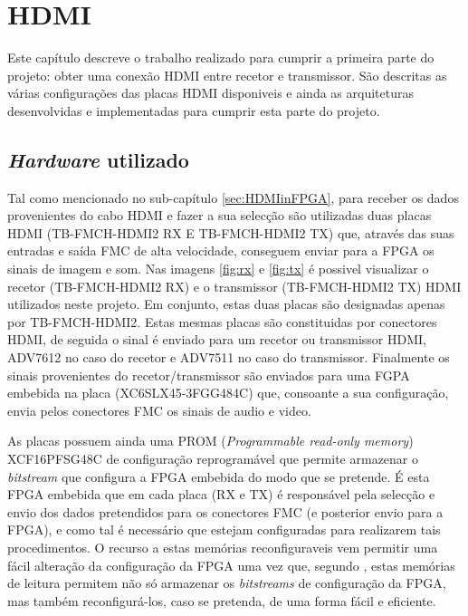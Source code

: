 \chapter{HDMI}\label{chap:chap3}

Este capítulo descreve o trabalho realizado para cumprir a primeira parte do projeto: obter uma conexão HDMI entre recetor e transmissor. São descritas as várias configurações das placas HDMI disponiveis e ainda as arquiteturas desenvolvidas e implementadas para cumprir esta parte do projeto. 

\section{\textit{Hardware} utilizado}

Tal como mencionado no sub-capítulo \ref{sec:HDMIinFPGA}, para receber os dados provenientes do cabo HDMI e fazer a sua selecção são utilizadas duas placas HDMI (TB-FMCH-HDMI2 RX E TB-FMCH-HDMI2 TX) que, através das suas entradas e saída FMC de alta velocidade, conseguem enviar para a FPGA os sinais de imagem e som. Nas imagens \ref{fig:rx} e \ref{fig:tx} é possivel visualizar o recetor (TB-FMCH-HDMI2 RX) e o transmissor (TB-FMCH-HDMI2 TX) HDMI utilizados neste projeto. Em conjunto, estas duas placas são designadas apenas por TB-FMCH-HDMI2. Estas mesmas placas são constituidas por conectores HDMI, de seguida o sinal é enviado para um recetor ou transmissor HDMI, ADV7612 no caso do recetor e ADV7511 no caso do transmissor. Finalmente os sinais provenientes do recetor/transmissor são enviados para uma FGPA embebida na placa (XC6SLX45-3FGG484C) que, consoante a sua configuração, envia pelos conectores FMC os sinais de audio e video.

As placas possuem ainda uma PROM (\textit{Programmable read-only memory}) XCF16PFSG48C de configuração reprogramável que permite armazenar o \textit{bitstream} que configura a FPGA embebida do modo que se pretende. É esta FPGA embebida que em cada placa (RX e TX) é responsável pela selecção e envio dos dados pretendidos para os conectores FMC (e posterior envio para a FPGA), e como tal é necessário que estejam configuradas para realizarem tais procedimentos. O recurso a estas memórias reconfiguraveis vem permitir uma fácil alteração da configuração da FPGA uma vez que, segundo \cite{R026}, estas memórias de leitura permitem não só armazenar os \textit{bitstreams} de configuração da FPGA, mas também reconfigurá-los, caso se pretenda, de uma forma fácil e eficiente.

